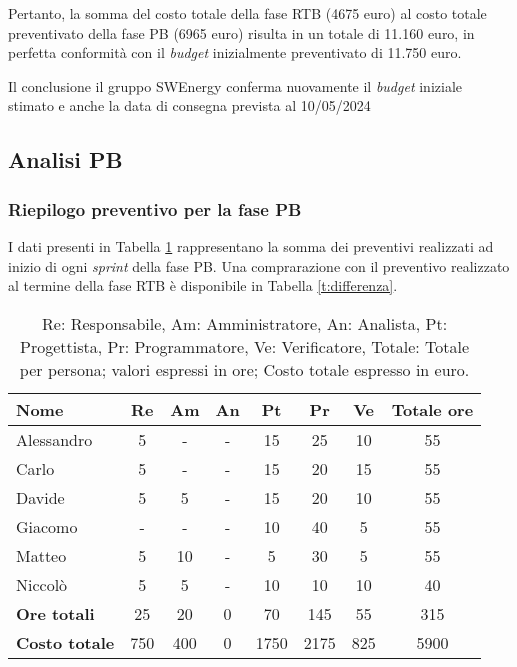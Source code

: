 Pertanto, la somma del costo totale della fase RTB (4675 euro) al costo totale preventivato della fase PB (6965 euro) risulta in un totale di 11.160 euro,
in perfetta conformità con il \textit{budget} inizialmente preventivato di 11.750 euro.


Il conclusione il gruppo SWEnergy conferma nuovamente il \textit{budget} iniziale stimato e anche la data di consegna prevista al 10/05/2024



\subsection{Analisi PB}
\subsubsection{Riepilogo preventivo per la fase PB}
I dati presenti in Tabella \ref{t:preventivoPB} rappresentano la somma dei preventivi realizzati ad inizio di ogni \textit{sprint} della fase PB.
Una comprarazione con il preventivo realizzato al termine della fase RTB è disponibile in Tabella \ref{t:differenza}.
\begin{table}[H]
	\centering
	\begin{tabular}{l|c|c|c|c|c|c|c}
		\textbf{Nome}         & \textbf{Re} & \textbf{Am} & \textbf{An} & \textbf{Pt} & \textbf{Pr} & \textbf{Ve} & \textbf{Totale ore} \\
		\hline
		Alessandro            & 5           & -           & -           & 15          & 25          & 10          & 55                  \\
		Carlo                 & 5           & -           & -           & 15          & 20          & 15          & 55                  \\
		Davide                & 5           & 5           & -           & 15          & 20          & 10          & 55                  \\
		Giacomo               & -           & -           & -           & 10          & 40          & 5           & 55                  \\
		Matteo                & 5           & 10          & -           & 5           & 30          & 5           & 55                  \\
		Niccolò               & 5           & 5           & -           & 10          & 10          & 10          & 40                  \\
		\hline
		\textbf{Ore totali}   & 25          & 20          & 0           & 70          & 145         & 55          & 315                 \\
		\textbf{Costo totale} & 750         & 400         & 0           & 1750        & 2175        & 825         & 5900
	\end{tabular}
	\caption{Re: Responsabile, Am: Amministratore, An: Analista, Pt: Progettista, Pr: Programmatore, Ve: Verificatore, Totale: Totale per persona; valori espressi in ore; Costo totale espresso in euro.}
	\label{t:preventivoPB}
\end{table}


